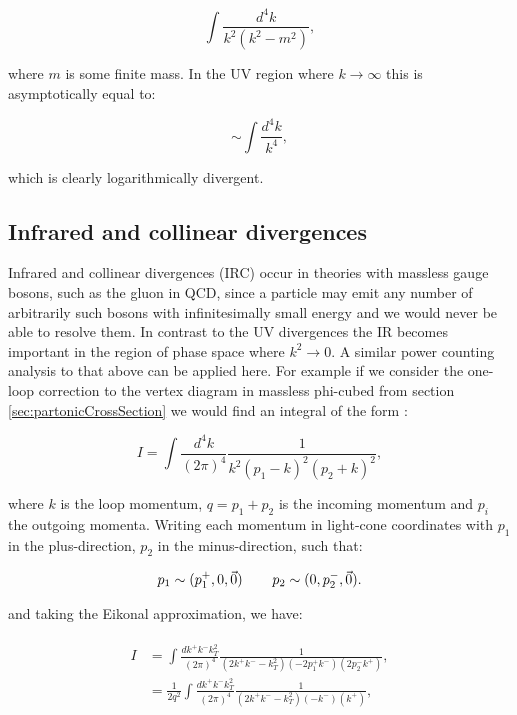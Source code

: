 		\begin{equation}
			\int \frac{d^4k}{k^2(k^2-m^2)},
		\end{equation}

		where $m$ is some finite mass. In the UV region where $k\rightarrow\infty$ this is asymptotically equal
		to:

		\begin{equation}
			\sim\int\frac{d^4k}{k^4},
		\end{equation}

		which is clearly logarithmically divergent.

	\subsection{Infrared and collinear divergences}

		Infrared and collinear divergences (IRC) occur in theories with massless gauge bosons, such as
		the gluon in QCD, since a particle may emit any number of arbitrarily such bosons with infinitesimally small
		energy and we would never be able to resolve them.  In contrast to the UV divergences
		the IR becomes important in the region of phase space where $k^2\rightarrow0$.  A similar power
		counting analysis to that above can be applied here.  For example if we consider the one-loop
		correction to the vertex diagram in massless phi-cubed from section \eqref{sec:partonicCrossSection}
		we would find an integral of the form \cite{Sterman:1995fz}:

		\begin{equation}
			I = \int\frac{d^4k}{(2\pi)^4}\frac{1}{k^2(p_1-k)^2(p_2+k)^2},
		\end{equation}

		where $k$ is the loop momentum, $q=p_1+p_2$ is the incoming momentum and $p_i$ the outgoing
		momenta.  Writing each momentum in light-cone coordinates with $p_1$ in the plus-direction,
		$p_2$ in the minus-direction, such that:

		\begin{align}
			p_1 \sim (p_1^+, 0, \vec{0}) \hspace{0.75cm} p_2 \sim (0, p_2^-, \vec{0}).
		\end{align}

		and taking the Eikonal approximation, we have:

		\begin{align}
		\begin{split}
			I &= \int\frac{dk^+k^-k^2_T}{(2\pi)^4}\frac{1}{(2k^+k^- - k_T^2)(-2p_1^+k^-)(2p_2^-k^+)},\\
			  &= \frac{1}{2q^2}\int\frac{dk^+k^-k^2_T}{(2\pi)^4}\frac{1}{(2k^+k^- - k_T^2)(-k^-)(k^+)},
			  \label{eqn:IRCscaling}
		\end{split}
		\end{align}

